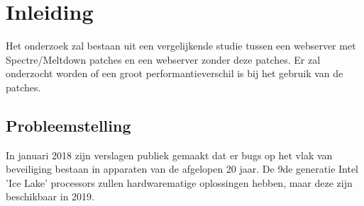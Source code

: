 
\chapter{Inleiding}
\label{ch:inleiding}


Het onderzoek zal bestaan uit een vergelijkende studie tussen een webserver met Spectre/Meltdown patches en een webserver zonder deze patches.
Er zal onderzocht worden of een groot performantieverschil is bij het gebruik van de patches.


\section{Probleemstelling}
\label{sec:probleemstelling}

In januari 2018 zijn verslagen publiek gemaakt \parencite{Kocher2018} dat er bugs op het vlak van beveiliging bestaan in apparaten van de afgelopen 20 jaar. De 9de generatie Intel 'Ice Lake' processors zullen hardwarematige oplossingen hebben, maar deze zijn beschikbaar in 2019.

